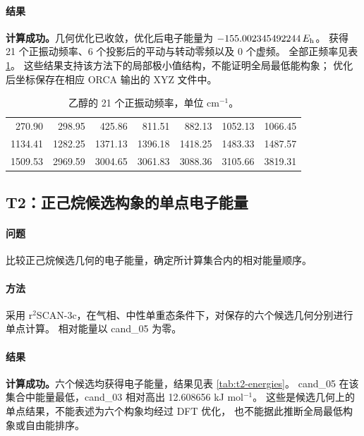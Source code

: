 \paragraph{结果}
\textbf{计算成功。}几何优化已收敛，优化后电子能量为 $-155.002345492244\,E_{\mathrm h}$。%
获得 21 个正振动频率、6 个投影后的平动与转动零频以及 0 个虚频。%
全部正频率见表 \ref{tab:t1-frequencies}。%
这些结果支持该方法下的局部极小值结构，不能证明全局最低能构象；%
优化后坐标保存在相应 ORCA 输出的 XYZ 文件中。

\begin{table}[H]
  \centering\small
  \caption{乙醇的 21 个正振动频率，单位 cm$^{-1}$。%
  }
  \label{tab:t1-frequencies}
  \begin{tabular}{rrrrrrr}
    \toprule
    270.90 & 298.95 & 425.86 & 811.51 & 882.13 & 1052.13 & 1066.45\\
    1134.41 & 1282.25 & 1371.13 & 1396.18 & 1418.25 & 1483.33 & 1487.57\\
    1509.53 & 2969.59 & 3004.65 & 3061.83 & 3088.36 & 3105.66 & 3819.31\\
    \bottomrule
  \end{tabular}
\end{table}

\subsection{T2：正己烷候选构象的单点电子能量}
\paragraph{问题}
比较正己烷候选几何的电子能量，确定所计算集合内的相对能量顺序。

\paragraph{方法}
采用 r$^{2}$SCAN-3c，在气相、中性单重态条件下，对保存的六个候选几何分别进行单点计算。%
相对能量以 cand\_05 为零。

\paragraph{结果}
\textbf{计算成功。}六个候选均获得电子能量，结果见表 \ref{tab:t2-energies}。%
cand\_05 在该集合中能量最低，cand\_03 相对高出 12.608656 kJ mol$^{-1}$。%
这些是候选几何上的单点结果，不能表述为六个构象均经过 DFT 优化，%
也不能据此推断全局最低构象或自由能排序。

